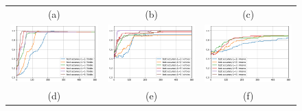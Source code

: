 \documentclass[12pt, a4paper,  nobibnotes]{article}
\begin{document}
\begin{figure}[H]
\begin{tabular}{ccc}
      (a) & (b) & (c) \\[6.5pt]
      \includegraphics[width=\thisfigurewidth\textwidth]{figures/test_acc_blobs_lr=0_1.png} & 
      \includegraphics[width=\thisfigurewidth\textwidth]{figures/test_acc_circles_lr=0_1.png} &
      \includegraphics[width=\thisfigurewidth\textwidth]{figures/test_acc_moons_lr=0_001.png} \\
      (d) & (e) & (f) \\[6.5pt]

\end{tabular}
\end{figure}
\end{document}
